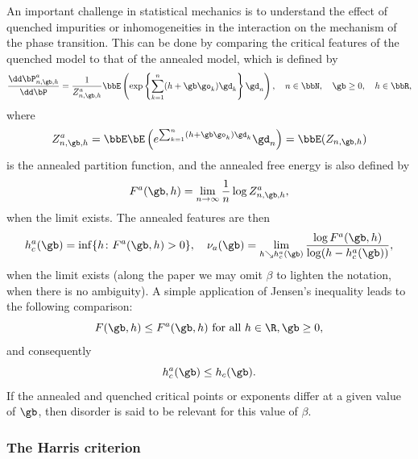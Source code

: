An important challenge in statistical mechanics is to understand the effect of quenched impurities or inhomogeneities in the interaction on the mechanism of the phase transition. This can be done by comparing the critical features of the quenched model to that of the annealed model, which is defined by
\begin{equation}\label{eq:defannmeas}
\frac{\dd \bP^a_{n,\gb,h}}{\dd \bP} = \frac{1}{Z^a_{n,\gb,h}} \bbE\left(\exp \left\{ \sum_{k=1}^n (h + \gb \go_k) \gd_k \right\} \gd_n \right), \quad n \in \bbN, \quad \gb \geq 0,\quad h \in \bbR,
\end{equation}
where
\begin{equation}\label{eq:defannpf}
Z^a_{n,\gb,h} = \bbE\bE\left(e^{\sum_{k=1}^n (h+ \gb \go_k)\gd_k} \gd_n\right) = \bbE (Z_{n, \gb, h})
\end{equation}
is the annealed partition function, and the annealed free energy is also defined by
\begin{equation}
F^a(\gb,h) = \lim_{n \to \infty} \frac{1}{n} \log Z^a_{n,\gb,h},
\end{equation}
when the limit exists. The annealed features are then
\begin{equation}
h^a_c(\gb) = \inf\{h \colon F^a(\gb,h) > 0\}, \quad \nu_a(\gb) = \lim_{h \searrow h_c^a(\gb)} \frac{\log F^a(\gb,h)}{\log (h - h_c^a(\gb))},
\end{equation}
when the limit exists (along the paper we may omit $\beta$ to lighten the notation, when there is no ambiguity). A simple application of Jensen's inequality leads to the following comparison:
\begin{equation}
F(\gb,h) \leq F^a(\gb,h) \text{ for all } h\in \R, \gb\ge0,
\end{equation}
and consequently
\begin{equation}
h_c^a(\gb) \leq h_c(\gb).
\end{equation}
If the annealed and quenched critical points or exponents differ at a given value of $\gb$, then disorder is said to be relevant for this value of $\beta$.

\subsubsection{The Harris criterion}

